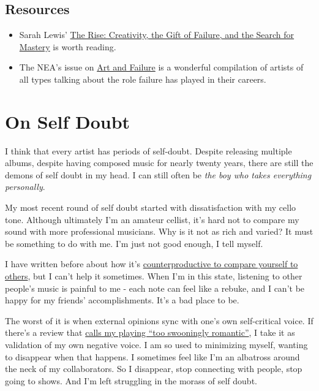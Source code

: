 \documentclass[
]{book}
\providecommand{\tightlist}{%
  \setlength{\itemsep}{0pt}\setlength{\parskip}{0pt}}
\begin{document}
\hypertarget{resources-8}{%
\section{Resources}\label{resources-8}}

\begin{itemize}
\tightlist
\item
  Sarah Lewis' \href{https://www.goodreads.com/book/show/18143786-the-rise}{The Rise: Creativity, the Gift of Failure, and the Search for Mastery} is worth reading.
\item
  The NEA's issue on \href{https://www.arts.gov/sites/default/files/nea_arts/NEA\%20Arts_2014_no4_web.pdf}{Art and Failure} is a wonderful compilation of artists of all types talking about the role failure has played in their careers.
\end{itemize}

\hypertarget{on-self-doubt}{%
\chapter{On Self Doubt}\label{on-self-doubt}}

I think that every artist has periods of self-doubt. Despite releasing multiple albums, despite having composed music for nearly twenty years, there are still the demons of self doubt in my head. I can still often be \emph{the boy who takes everything personally}.

My most recent round of self doubt started with dissatisfaction with my cello tone. Although ultimately I'm an amateur cellist, it's hard not to compare my sound with more professional musicians. Why is it not as rich and varied? It must be something to do with me. I'm just not good enough, I tell myself.

I have written before about how it's \href{on-success-or-how-to-suck-it-up-and-be-happy-for-your-successful-friends.html}{counterproductive to compare yourself to others}, but I can't help it sometimes. When I'm in this state, listening to other people's music is painful to me - each note can feel like a rebuke, and I can't be happy for my friends' accomplishments. It's a bad place to be.

The worst of it is when external opinions sync with one's own self-critical voice. If there's a review that \href{https://www.fluid-radio.co.uk/2017/07/marcus-fischer-film-variations/}{calls my playing ``too swooningly romantic''}, I take it as validation of my own negative voice. I am so used to minimizing myself, wanting to disappear when that happens. I sometimes feel like I'm an albatross around the neck of my collaborators. So I disappear, stop connecting with people, stop going to shows. And I'm left struggling in the morass of self doubt.
\end{document}
